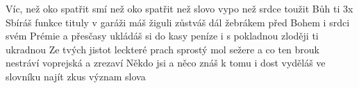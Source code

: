 \begin{TEXT}{Víc, než oko spatřit smí}
\REFREN  {} než oko spatřit   než slovo vypo \NL
{} než srdce toužit   Bůh ti 3x 
\SLOKA Sbíráš funkce tituly v garáži máš žiguli \NL
zůstváš dál žebrákem před Bohem i srdci svém 
\SLOKA Prémie a přesčasy ukládáš si do kasy \NL
peníze i s pokladnou zloději ti ukradnou 
\SLOKA Ze tvých jistot leckteré prach sprostý mol sežere \NL
a co ten brouk nestráví voprejská a zrezaví 
\SLOKA Někdo jsi a něco znáš k tomu i dost vyděláš \NL
ve slovníku najít zkus význam slova  \NL
\end{TEXT}
